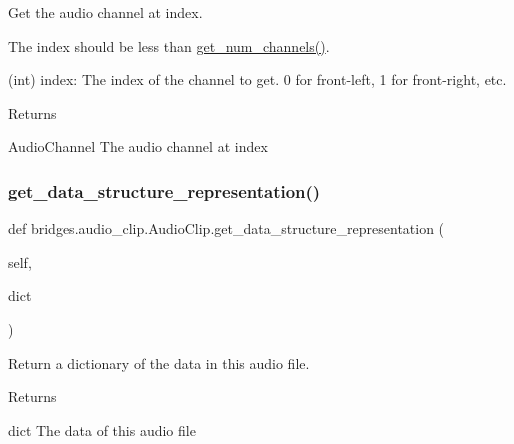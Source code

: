 Get the audio channel at index. 

The index should be less than \hyperlink{classbridges_1_1audio__clip_1_1_audio_clip_af881900e292374fabf1f53a253571e5f}{get\+\_\+num\+\_\+channels()}. \begin{DoxyVerb}       (int) index: The index of the channel to get. 0 for front-left, 1 for front-right, etc.
\end{DoxyVerb}
 \begin{DoxyReturn}{Returns}


Audio\+Channel The audio channel at index 
\end{DoxyReturn}
\mbox{\label{classbridges_1_1audio__clip_1_1_audio_clip_a58dcd978d0a48dd338f850d7fea3d993}} 
\subsubsection{\texorpdfstring{get\+\_\+data\+\_\+structure\+\_\+representation()}{get\_data\_structure\_representation()}}
{\footnotesize\ttfamily def bridges.\+audio\+\_\+clip.\+Audio\+Clip.\+get\+\_\+data\+\_\+structure\+\_\+representation (\begin{DoxyParamCaption}\item[{}]{self,  }\item[{}]{dict }\end{DoxyParamCaption})}



Return a dictionary of the data in this audio file. 

\begin{DoxyReturn}{Returns}


dict The data of this audio file 
\end{DoxyReturn}
\mbox{\label{classbridges_1_1audio__clip_1_1_audio_clip_a3fa69daf604ed0d7f22fa8f2c46cc0c4}} 
